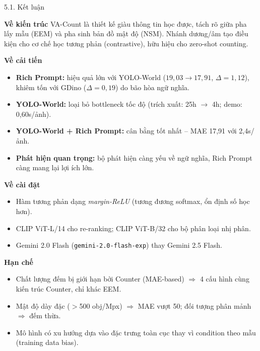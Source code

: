 \documentclass[11pt]{beamer}
\begin{document}
\begin{frame}[shrink=10]{5.1. Kết luận}
\scriptsize

\begin{block}{\textbf{Về kiến trúc}}
VA-Count là thiết kế giàu thông tin học được, tách rõ giữa pha lấy mẫu (EEM) và pha sinh bản đồ mật độ (NSM). Nhánh dương/âm tạo điều kiện cho cơ chế học tương phản (contrastive), hữu hiệu cho zero-shot counting.
\end{block}

\begin{block}{\textbf{Về cải tiến}}
\begin{itemize}\setlength{\itemsep}{2pt}
  \item \textbf{Rich Prompt:} hiệu quả lớn với YOLO-World ($19{,}03 \to 17{,}91$, $\Delta=1{,}12$), khiêm tốn với GDino ($\Delta=0{,}19$) do bão hòa ngữ nghĩa.
  \item \textbf{YOLO-World:} loại bỏ bottleneck tốc độ (trích xuất: 25h $\to$ 4h; demo: 0,60s/ảnh).
  \item \textbf{YOLO-World + Rich Prompt:} cân bằng tốt nhất -- MAE 17,91 với 2,4s/ảnh.
  \item \textbf{Phát hiện quan trọng:} bộ phát hiện càng yếu về ngữ nghĩa, Rich Prompt càng mang lại lợi ích lớn.
\end{itemize}
\end{block}

\begin{block}{\textbf{Về cài đặt}}
\begin{itemize}\setlength{\itemsep}{1pt}
  \item Hàm tương phản dạng \emph{margin-ReLU} (tương đương softmax, ổn định số học hơn).
  \item CLIP ViT-L/14 cho re-ranking; CLIP ViT-B/32 cho bộ phân loại nhị phân.
  \item Gemini 2.0 Flash (\texttt{gemini-2.0-flash-exp}) thay Gemini 2.5 Flash.
\end{itemize}
\end{block}

\begin{block}{\textbf{Hạn chế}}
\begin{itemize}\setlength{\itemsep}{1pt}
  \item Chất lượng đếm bị giới hạn bởi Counter (MAE-based) $\Rightarrow$ 4 cấu hình cùng kiến trúc Counter, chỉ khác EEM.
  \item Mật độ dày đặc ($>$500 obj/Mpx) $\Rightarrow$ MAE vượt 50; đối tượng phân mảnh $\Rightarrow$ đếm thừa.
  \item Mô hình có xu hướng dựa vào đặc trưng toàn cục thay vì condition theo mẫu (training data bias).
\end{itemize}
\end{block}

\end{frame}
\end{document}
